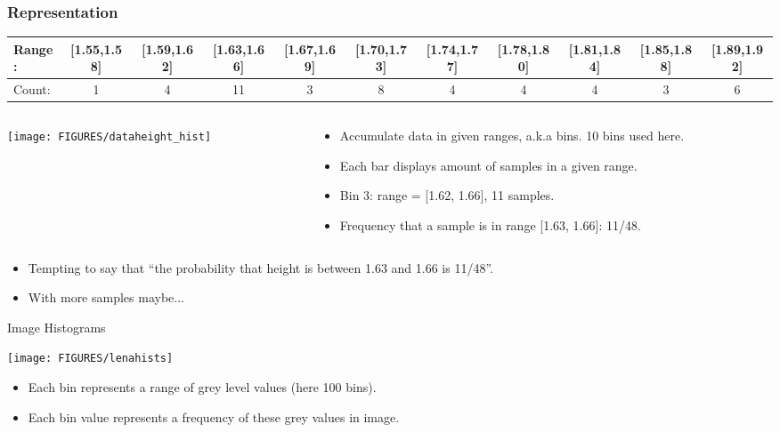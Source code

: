 \documentclass[9pt]{beamer}
\begin{document}
\begin{frame}
  \frametitle{Representation}
  \begin{center}{\tiny
      \setlength\tabcolsep{2pt}%
    \begin{tabular}[h]{|lcccccccccc|}
      \hline
      Range: & [1.55,1.58] & [1.59,1.62] & [1.63,1.66] & [1.67,1.69] & [1.70,1.73] & [1.74,1.77] & [1.78,1.80] & [1.81,1.84] & [1.85,1.88] & [1.89,1.92]\\
      \hline
      Count: & 1 & 4 & 11 & 3 & 8 & 4 & 4 & 4 & 3 & 6\\
      \hline
    \end{tabular}}
  \end{center}
  
  \begin{columns}
    \begin{column}{0.5\textwidth}
      \begin{center}
        \texttt{[image: FIGURES/dataheight\_hist]}
      \end{center}
    \end{column}
    \begin{column}{0.5\textwidth}
      \begin{itemize}
      \item Accumulate data in given ranges, a.k.a bins. 10 bins used here.
      \item Each bar displays amount of samples in a given range.
      \item Bin 3: range = [1.62, 1.66], 11 samples.
      \item Frequency that a sample is in range [1.63, 1.66]: 11/48.
      \end{itemize}
    \end{column}
  \end{columns} \pause
  \begin{itemize}
  \item Tempting to say that ``the probability that height is between 1.63 and 1.66 is 11/48''.
  \item With more samples maybe...
  \end{itemize}
\end{frame}


\begin{frame}{Image Histograms}
  \begin{center}
    \texttt{[image: FIGURES/lenahists]}
  \end{center}
  \begin{itemize}
  \item Each bin represents a range of grey level values (here 100 bins).
  \item Each bin value represents a frequency of these grey values in image. 
  \end{itemize}
\end{frame}
\end{document}
